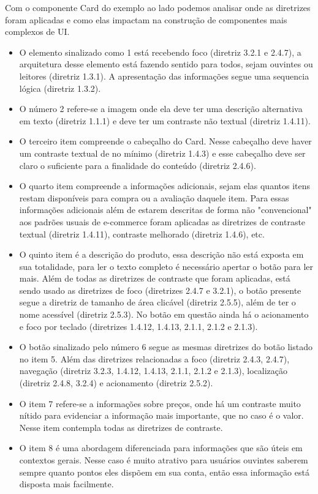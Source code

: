 {Com o componente Card do exemplo ao lado podemos analisar onde as diretrizes foram aplicadas e como elas impactam na construção de componentes mais complexos de UI. 
\begin{itemize}
\item O elemento sinalizado como 1 está recebendo foco (diretriz 3.2.1 e 2.4.7), a arquitetura desse elemento está fazendo sentido para todos, sejam ouvintes ou leitores (diretriz 1.3.1). A apresentação das informações segue uma sequencia lógica (diretriz 1.3.2).  
\item O número 2 refere-se a imagem onde ela deve ter uma descrição alternativa em texto (diretriz 1.1.1) e deve ter um contraste não textual (diretriz 1.4.11).
\item O terceiro item compreende o cabeçalho do Card. Nesse cabeçalho deve haver um contraste textual de no mínimo (diretriz 1.4.3) e esse cabeçalho deve ser claro o suficiente para a finalidade do conteúdo (diretriz 2.4.6).
\item O quarto item compreende a informações adicionais, sejam elas quantos itens restam disponíveis para compra ou a avaliação daquele item. Para essas informações adicionais além de estarem descritas de forma não "convencional" aos padrões usuais de e-commerce foram aplicadas as diretrizes de contraste textual (diretriz 1.4.11), contraste melhorado (diretriz 1.4.6), etc.
\end{itemize}
\newpage
\begin{itemize}
\item O quinto item é a descrição do produto, essa descrição não está exposta em sua totalidade, para ler o texto completo é necessário apertar o botão para ler mais. Além de todas as diretrizes de contraste que foram aplicadas, está sendo usado as diretrizes de foco (diretrizes 2.4.7 e 3.2.1), o botão presente segue a diretriz de tamanho de área clicável (diretriz 2.5.5), além de ter o nome acessível (diretriz 2.5.3). No botão em questão ainda há o acionamento e foco por teclado (diretrizes 1.4.12, 1.4.13, 2.1.1, 2.1.2 e 2.1.3). 
\item O botão sinalizado pelo número 6 segue as mesmas diretrizes do botão listado no item 5. Além das diretrizes relacionadas a foco (diretriz 2.4.3, 2.4.7), navegação (diretriz 3.2.3, 1.4.12, 1.4.13, 2.1.1, 2.1.2 e 2.1.3), localização (diretriz 2.4.8, 3.2.4) e acionamento (diretriz 2.5.2).
\item O item 7 refere-se a informações sobre preços, onde há um contraste muito nítido para evidenciar a informação mais importante, que no caso é o valor. Nesse item contempla todas as diretrizes de contraste. 
\item O item 8 é uma abordagem diferenciada para informações que são úteis em contextos gerais. Nesse caso é muito atrativo para usuários ouvintes saberem sempre quanto pontos eles dispõem em sua conta, então essa informação está disposta mais facilmente. 
\end{itemize}

}


